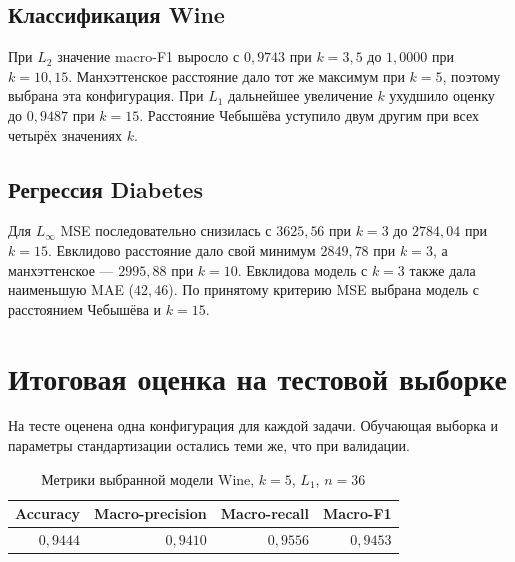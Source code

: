 \subsection{Классификация Wine}


При \(L_2\) значение macro-F1 выросло с \(0{,}9743\) при \(k=3,5\) до
\(1{,}0000\) при \(k=10,15\). Манхэттенское расстояние дало тот же максимум
при \(k=5\), поэтому выбрана эта конфигурация. При \(L_1\) дальнейшее
увеличение \(k\) ухудшило оценку до \(0{,}9487\) при \(k=15\).
Расстояние Чебышёва уступило двум другим при всех четырёх значениях \(k\).

\clearpage
\subsection{Регрессия Diabetes}


Для \(L_\infty\) MSE последовательно снизилась с \(3625{,}56\) при \(k=3\)
до \(2784{,}04\) при \(k=15\). Евклидово расстояние дало свой минимум
\(2849{,}78\) при \(k=3\), а манхэттенское --- \(2995{,}88\) при \(k=10\).
Евклидова модель с \(k=3\) также дала наименьшую MAE (\(42{,}46\)).
По принятому критерию MSE выбрана модель с расстоянием Чебышёва и \(k=15\).

\clearpage
\section{Итоговая оценка на тестовой выборке}

На тесте оценена одна конфигурация для каждой задачи. Обучающая выборка
и параметры стандартизации остались теми же, что при валидации.

\begin{table}[!ht]
\centering\small
\caption{Метрики выбранной модели Wine, \(k=5\), \(L_1\), \(n=36\)}
\begin{tabular}{rrrr}
\toprule
Accuracy & Macro-precision & Macro-recall & Macro-F1 \\
\midrule
\(0{,}9444\) & \(0{,}9410\) & \(0{,}9556\) & \(0{,}9453\) \\
\bottomrule
\end{tabular}
\end{table}

